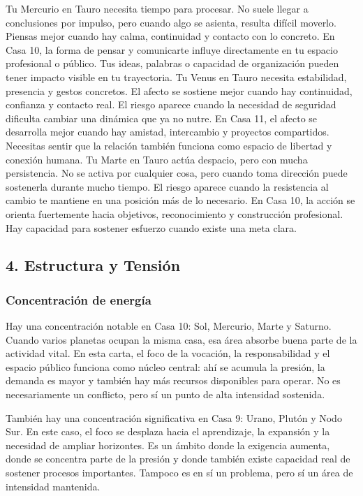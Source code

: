 \documentclass[11pt,a4paper]{article}\usepackage[utf8]{inputenc}
\begin{document}
Tu Mercurio en Tauro necesita tiempo para procesar. No suele llegar a conclusiones por impulso, pero cuando algo se asienta, resulta difícil moverlo. Piensas mejor cuando hay calma, continuidad y contacto con lo concreto. En Casa 10, la forma de pensar y comunicarte influye directamente en tu espacio profesional o público. Tus ideas, palabras o capacidad de organización pueden tener impacto visible en tu trayectoria. Tu Venus en Tauro necesita estabilidad, presencia y gestos concretos. El afecto se sostiene mejor cuando hay continuidad, confianza y contacto real. El riesgo aparece cuando la necesidad de seguridad dificulta cambiar una dinámica que ya no nutre. En Casa 11, el afecto se desarrolla mejor cuando hay amistad, intercambio y proyectos compartidos. Necesitas sentir que la relación también funciona como espacio de libertad y conexión humana. Tu Marte en Tauro actúa despacio, pero con mucha persistencia. No se activa por cualquier cosa, pero cuando toma dirección puede sostenerla durante mucho tiempo. El riesgo aparece cuando la resistencia al cambio te mantiene en una posición más de lo necesario. En Casa 10, la acción se orienta fuertemente hacia objetivos, reconocimiento y construcción profesional. Hay capacidad para sostener esfuerzo cuando existe una meta clara.

\vspace{0.8cm}

\subsection{4. Estructura y Tensión}

\subsubsection*{Concentración de energía}

Hay una concentración notable en Casa 10: Sol, Mercurio, Marte y Saturno. Cuando varios planetas ocupan la misma casa, esa área absorbe buena parte de la actividad vital. En esta carta, el foco de la vocación, la responsabilidad y el espacio público funciona como núcleo central: ahí se acumula la presión, la demanda es mayor y también hay más recursos disponibles para operar. No es necesariamente un conflicto, pero sí un punto de alta intensidad sostenida.

También hay una concentración significativa en Casa 9: Urano, Plutón y Nodo Sur. En este caso, el foco se desplaza hacia el aprendizaje, la expansión y la necesidad de ampliar horizontes. Es un ámbito donde la exigencia aumenta, donde se concentra parte de la presión y donde también existe capacidad real de sostener procesos importantes. Tampoco es en sí un problema, pero sí un área de intensidad mantenida.
\end{document}

